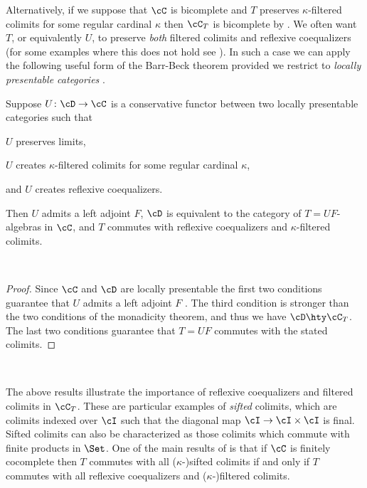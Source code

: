 \documentclass[leqno,oneside,english]{elsarticle}
\newcounter{enumisaved}
\newlength{\thmsaved}
\newlength{\thmnow}
\begin{document}
Alternatively, if we suppose that $\cC$ is bicomplete and $T$ preserves
$\kappa$-filtered colimits for some regular cardinal $\kappa$ then
$\cC_T$ is bicomplete by \cite[Prop.~4.3.6]{Bor94a}. We often want $T$, or
equivalently $U$, to preserve \emph{both} filtered colimits and
reflexive coequalizers (for some examples where this does not hold
see \cite[\S~4.6]{Bor94a}). In such a case we can apply the following
useful form of the Barr-Beck theorem provided we restrict to
\emph{locally presentable categories} \cite[\S~5.2]{Bor94a}.

\begin{prop}\label{prop:barr-beck-for-presentable-categories}
  Suppose $U\colon \cD\rightarrow \cC$ is a conservative functor between two locally
  presentable categories such that 
  \begin{hypothenumerate}
	\item $U$ preserves limits,
	\item $U$ creates $\kappa$-filtered colimits for some regular
	  cardinal $\kappa$,
	\item and $U$ creates reflexive coequalizers.
  \end{hypothenumerate}
  Then $U$ admits a left adjoint $F$, $\cD$ is equivalent to 
  the category of $T=UF$-algebras in $\cC$, and $T$ commutes with
  reflexive coequalizers and $\kappa$-filtered colimits. 
\end{prop}
{{    {}  \ifshowcomplete
  \ 
  {\begin{proof}
  Since $\cC$ and $\cD$ are locally presentable the first two
  conditions guarantee that $U$ admits a left adjoint $F$
  \cite[Thm.~5.5.7]{Bor94a}. The third condition is stronger than the two
  conditions of the monadicity theorem, and thus we have $\cD \hty
  \cC_T$. The last two conditions guarantee that $T=UF$ commutes with
  the stated colimits.
\end{proof}
}
  {}
  \ 
  \ifthenelse{\lengthtest{\thmnow > \thmsaved}}{
    
    \setcounter{thm}{{\strip@pt{\thmsaved}}}  
  }{
    
  }
  \setcounter{enumi}{\theenumisaved}
    \else  \fi
}}{}

The above results illustrate the importance of reflexive coequalizers
and filtered colimits in $\cC_T$. These are particular
examples of \emph{sifted} colimits, which are colimits indexed over
$\cI$ such that the diagonal
map $\cI\rightarrow \cI\times \cI$ is final. Sifted colimits can also be
characterized as those colimits which commute with finite products in
$\Set$. One of the main results of \cite[Thm.~2.1]{ARV10} is that if $\cC$ is
finitely cocomplete then $T$ commutes with all ($\kappa$-)sifted
colimits if and only if $T$ commutes with all reflexive coequalizers and
($\kappa$-)filtered colimits.
\end{document}
